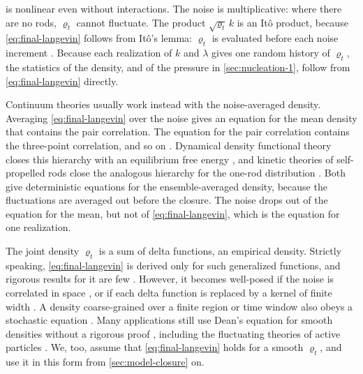 \documentclass[aps,pre,reprint,superscriptaddress,longbibliography,nofootinbib
]{revtex4-2}
\begin{document}
 is nonlinear even without
interactions. The noise is multiplicative: where there are
no rods, $\varrho_t$ cannot fluctuate. The product
$\sqrt{\varrho_t}\,k$ is an It\^o product, because
\cref{eq:final-langevin} follows from It\^o's lemma:
$\varrho_t$ is evaluated before each noise increment
\cite{dean1996}. Because each realization of $k$ and
$\lambda$ gives one random history of $\varrho_t$, the
statistics of the density, and of the pressure in
\cref{sec:nucleation-1}, follow from
\cref{eq:final-langevin} directly.

Continuum theories usually work instead with the
noise-averaged density. Averaging \cref{eq:final-langevin}
over the noise gives an equation for the mean density that
contains the pair correlation. The equation for the pair
correlation contains the three-point correlation, and so on
\cite{dean1996}. Dynamical density functional theory closes
this hierarchy with an equilibrium free energy
\cite{marconi1999dynamic,tevrugt2020classical}, and kinetic
theories of self-propelled rods close the analogous
hierarchy for the one-rod distribution
\cite{baskaran2008hydrodynamics}. Both give deterministic
equations for the ensemble-averaged density, because the
fluctuations are averaged out before the closure. The noise
drops out of the equation for the mean, but not of
\cref{eq:final-langevin}, which is the equation for one
realization.

The joint density $\varrho_t$ is a sum of delta functions,
an empirical density. Strictly speaking,
\cref{eq:final-langevin} is derived only for such
generalized functions, and rigorous results for it are few
\cite{konarovskyi2019dean,konarovskyi2020dean,
cornalba2023dean}. However, it becomes well-posed if the
noise is correlated in space \cite{fehrman2024well}, or if
each delta function is replaced by a kernel of finite width
\cite{cornalba2019regularized}. A density coarse-grained
over a finite region or time window also obeys a stochastic
equation \cite{archer2004dynamical}. Many applications
still use Dean's equation for smooth densities without a
rigorous proof
\cite{kruger2017gaussian,demery2016conductivity,
dean2014relaxation,demery2014generalized}, including the
fluctuating theories of active particles
\cite{tailleur2008statistical,solon2015active,bertin2013}.
We, too, assume that \cref{eq:final-langevin} holds for a
smooth $\varrho_t$, and use it in this form from
\cref{sec:model-closure} on.
\end{document}
